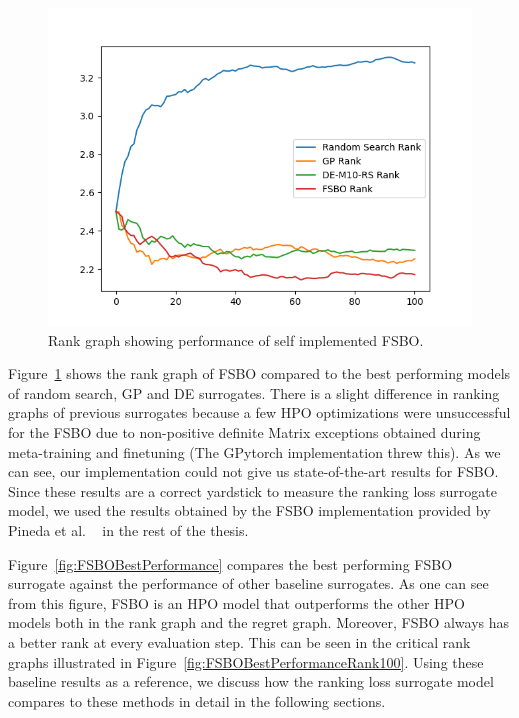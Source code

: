 \documentclass[12pt, twoside, ngerman]{report}
\begin{document}
\begin{figure}[h]
  \centering
    \includegraphics[scale=0.5]{images/FSBOPerformance}
    \caption{Rank graph showing performance of self implemented FSBO.}
    \label{fig:FSBOPerformance}
\end{figure}

Figure~\ref{fig:FSBOPerformance} shows the rank graph of FSBO compared to the best performing models of random search, GP and DE surrogates.
There is a slight difference in ranking graphs of previous surrogates because a few HPO optimizations were unsuccessful for the FSBO due to non-positive definite Matrix exceptions obtained during meta-training and finetuning (The GPytorch implementation threw this).
As we can see,  our implementation could not give us state-of-the-art results for FSBO.
Since these results are a correct yardstick to measure the ranking loss surrogate model, we used the results obtained by the FSBO implementation provided by Pineda et al. ~\cite{pineda2021hpob} in the rest of the thesis.


Figure~\ref{fig:FSBOBestPerformance} compares the best performing FSBO surrogate against the performance of other baseline surrogates.
As one can see from this figure, FSBO is an HPO model that outperforms the other HPO models both in the rank graph and the regret graph.
Moreover,  FSBO always has a better rank at every evaluation step.
This can be seen in the critical rank graphs illustrated in Figure~\ref{fig:FSBOBestPerformanceRank100}.
Using these baseline results as a reference, we discuss how the ranking loss surrogate model compares to these methods in detail in the following sections.
\end{document}
